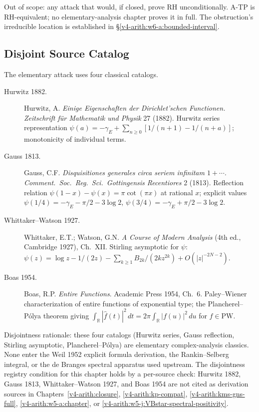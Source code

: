 Out of scope: any attack that would, if closed, prove RH
unconditionally. A-TP is RH-equivalent; no elementary-analysis
chapter proves it in full. The obstruction's irreducible location is
established in \S\ref{v4-arith:w6-a:bounded-interval}.

\subsection{Disjoint Source Catalog}
\label{v4-arith:w6-a:sources}

The elementary attack uses four classical catalogs.

\begin{description}
\item[Hurwitz 1882.] Hurwitz, A. \emph{Einige Eigenschaften der
Dirichlet'schen Functionen.} \emph{Zeitschrift f\"ur Mathematik und
Physik} 27 (1882). Hurwitz series representation
\(\psi(a)=-\gamma_{E}+\sum_{n\geq 0}[1/(n+1)-1/(n+a)]\); monotonicity of
individual terms.
\item[Gauss 1813.] Gauss, C.F. \emph{Disquisitiones generales circa
seriem infinitam \(1+\cdots\)}. \emph{Comment.~Soc.~Reg.~Sci.~Gottingensis
Recentiores} 2 (1813). Reflection relation
\(\psi(1-x)-\psi(x)=\pi\cot(\pi x)\) at rational \(x\); explicit values
\(\psi(1/4)=-\gamma_{E}-\pi/2-3\log 2\),
\(\psi(3/4)=-\gamma_{E}+\pi/2-3\log 2\).
\item[Whittaker--Watson 1927.] Whittaker, E.T.; Watson, G.N. \emph{A
Course of Modern Analysis} (4th ed., Cambridge 1927), Ch.~XII.
Stirling asymptotic for \(\psi\):
\(\psi(z)=\log z-1/(2z)-\sum_{k\geq 1}B_{2k}/(2k z^{2k})+O(|z|^{-2N-2})\).
\item[Boas 1954.] Boas, R.P. \emph{Entire Functions}.
Academic Press 1954, Ch.~6. Paley--Wiener characterization of entire
functions of exponential type; the Plancherel--P\'olya theorem giving
\(\int_{\mathbb{R}}|\widehat{f}(t)|^{2}\,dt=2\pi\int_{\mathbb{R}}|f(u)|^{2}\,du\)
for \(f\in\mathrm{PW}\).
\end{description}

Disjointness rationale: these four catalogs (Hurwitz series, Gauss
reflection, Stirling asymptotic, Plancherel--P\'olya) are elementary
complex-analysis classics. None enter the Weil 1952 explicit formula
derivation, the Rankin--Selberg integral, or the de Branges spectral
apparatus used upstream. The disjointness registry condition for this
chapter holds by a per-source check: Hurwitz 1882, Gauss 1813,
Whittaker--Watson 1927, and Boas 1954 are not cited as derivation
sources in Chapters~\ref{v4-arith:closure}, \ref{v4-arith:kp-compat},
\ref{v4-arith:kms-gns-full}, \ref{v4-arith:w5-a:chapter}, or
\ref{v4-arith:w5-j:VBstar-spectral-positivity}.

